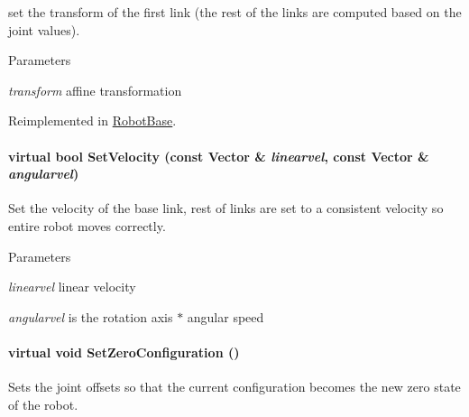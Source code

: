 set the transform of the first link (the rest of the links are computed based on the joint values). 


\begin{DoxyParams}{Parameters}
\item[{\em transform}]affine transformation \end{DoxyParams}


Reimplemented in \hyperlink{classOpenRAVE_1_1RobotBase_ad19fd054ec0bb506ca08d1a7deaa005d}{RobotBase}.

\hypertarget{classOpenRAVE_1_1KinBody_ac739ab6c3a2a0d486cc0d280bb2b74db}{
\paragraph[{SetVelocity}]{\setlength{\rightskip}{0pt plus 5cm}virtual bool SetVelocity (const Vector \& {\em linearvel}, \/  const Vector \& {\em angularvel})}\hfill}
\label{classOpenRAVE_1_1KinBody_ac739ab6c3a2a0d486cc0d280bb2b74db}


Set the velocity of the base link, rest of links are set to a consistent velocity so entire robot moves correctly. 


\begin{DoxyParams}{Parameters}
\item[{\em linearvel}]linear velocity \item[{\em angularvel}]is the rotation axis $\ast$ angular speed \end{DoxyParams}
\hypertarget{classOpenRAVE_1_1KinBody_a869f9a89146a89d8248f392c9610b7b7}{
\paragraph[{SetZeroConfiguration}]{\setlength{\rightskip}{0pt plus 5cm}virtual void SetZeroConfiguration ()}\hfill}
\label{classOpenRAVE_1_1KinBody_a869f9a89146a89d8248f392c9610b7b7}


Sets the joint offsets so that the current configuration becomes the new zero state of the robot. 

